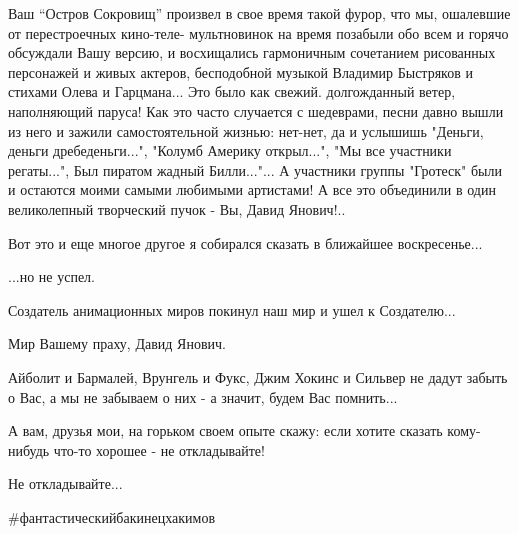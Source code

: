 Ваш \enquote{Остров Сокровищ} произвел в свое время такой фурор, что мы, ошалевшие от
перестроечных кино-теле- мультновинок на время позабыли обо всем и горячо
обсуждали Вашу версию, и восхищались гармоничным сочетанием рисованных
персонажей и живых актеров, бесподобной музыкой Владимир Быстряков и стихами
Олева и Гарцмана... Это было как свежий. долгожданный ветер, наполняющий
паруса! Как это часто случается с шедеврами, песни давно вышли из него и зажили
самостоятельной жизнью: нет-нет, да и услышишь "Деньги, деньги дребеденьги...",
"Колумб Америку открыл...", "Мы все участники регаты...", Был пиратом жадный
Билли..."... А участники группы "Гротеск" были и остаются моими самыми любимыми
артистами! А все это объединили в один великолепный творческий пучок - Вы,
Давид Янович!.. 

Вот это и еще многое другое я собирался сказать в ближайшее воскресенье...

...но не успел.

Создатель анимационных миров покинул наш мир и ушел к Создателю...

Мир Вашему праху, Давид Янович. 

Айболит и Бармалей, Врунгель и Фукс, Джим Хокинс и Сильвер не дадут забыть о
Вас, а мы не забываем о них - а значит, будем Вас помнить...

А вам, друзья мои, на горьком своем опыте скажу: если хотите сказать
кому-нибудь что-то хорошее - не откладывайте!

Не откладывайте...

\#фантастическийбакинецхакимов
